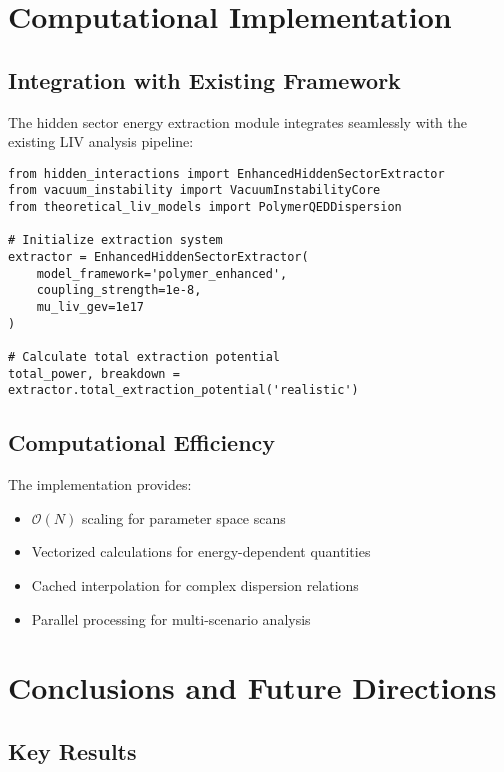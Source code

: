 \documentclass[12pt]{article}
\begin{document}
\section{Computational Implementation}

\subsection{Integration with Existing Framework}

The hidden sector energy extraction module integrates seamlessly with the existing LIV analysis pipeline:

\begin{verbatim}
from hidden_interactions import EnhancedHiddenSectorExtractor
from vacuum_instability import VacuumInstabilityCore
from theoretical_liv_models import PolymerQEDDispersion

# Initialize extraction system
extractor = EnhancedHiddenSectorExtractor(
    model_framework='polymer_enhanced',
    coupling_strength=1e-8,
    mu_liv_gev=1e17
)

# Calculate total extraction potential
total_power, breakdown = extractor.total_extraction_potential('realistic')
\end{verbatim}

\subsection{Computational Efficiency}

The implementation provides:
\begin{itemize}
\item $\mathcal{O}(N)$ scaling for parameter space scans
\item Vectorized calculations for energy-dependent quantities
\item Cached interpolation for complex dispersion relations
\item Parallel processing for multi-scenario analysis
\end{itemize}

\section{Conclusions and Future Directions}

\subsection{Key Results}
\end{document}
